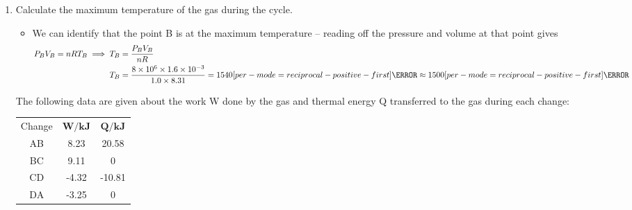\documentclass[a4paper,12pt]{article}
\let\oldsi\si
\renewcommand{\si}[1]{\oldsi[per-mode=reciprocal-positive-first]{#1}}
\begin{document}
\begin{enumerate}[label=(\alph*)]
  \item Calculate the maximum temperature of the gas during the cycle.
        \begin{itemize}
          \item We can identify that the point B is at the maximum temperature -- reading off the pressure and volume at that point gives
                \begin{align*}
                  P_BV_B = nRT_B \implies T_B & = \frac{P_BV_B}{nR}                                                                                            \\
                  T_B                         & = \frac{8 \times 10^6 \times 1.6\times 10^{-3}}{1.0 \times 8.31} = 1540 \si{\kelvin} \approx 1500 \si{\kelvin}
                \end{align*}
        \end{itemize}
        \pagebreak

        The following data are given about the work W done by the gas and thermal energy Q transferred to the gas during each change:

        \begin{table}[H]
          \centering
          \begin{tabular}{|ccc|}
            \hline Change & $\boldsymbol{W} / \mathbf{k J}$ & $\boldsymbol{Q} / \mathbf{k J}$ \\
            AB            & 8.23                            & 20.58                           \\
            BC            & 9.11                            & 0                               \\
            CD            & -4.32                           & -10.81                          \\
            DA            & -3.25                           & 0                               \\
            \hline
          \end{tabular}
        \end{table}


\end{enumerate}
\end{document}
